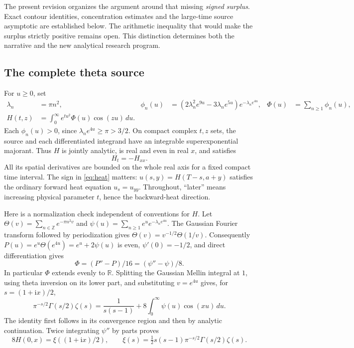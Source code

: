 \documentclass[11pt]{article}
\theoremstyle{definition}
\newcommand{\R}{\mathbb R}
\newcommand{\dd}{\,d}
\newcommand{\ii}{\mathrm i}
\begin{document}
The present revision organizes the argument around that missing
\emph{signed surplus}. Exact contour identities, concentration
estimates and the large-time source asymptotic are established below.
The arithmetic inequality that would make the surplus strictly positive
remains open. This distinction determines both the narrative and the
new analytical research program.

\subsection{The complete theta source}
For \(u\ge0\), set
\begin{align}
 \lambda_n&=\pi n^2,&
 \phi_n(u)&=(2\lambda_n^2e^{9u}-3\lambda_ne^{5u})
                      e^{-\lambda_ne^{4u}},&
 \Phi(u)&=\sum_{n\ge1}\phi_n(u), \label{eq:source}\\
 H(t,z)&=\int_0^\infty e^{tu^2}\Phi(u)\cos(zu)\dd u. \label{eq:H}
\end{align}
Each \(\phi_n(u)>0\), since
\(\lambda_ne^{4u}\ge\pi>3/2\). On compact complex \(t,z\) sets, the
source and each differentiated integrand have an integrable
superexponential majorant. Thus \(H\) is jointly analytic, is real and
even in real \(x\), and satisfies
\begin{equation}
                         H_t=-H_{xx}.                 \label{eq:heat}
\end{equation}
All its spatial derivatives are bounded on the whole real axis for a
fixed compact time interval. The sign in \eqref{eq:heat} matters:
\(u(s,y)=H(T-s,a+y)\) satisfies the ordinary forward heat equation
\(u_s=u_{yy}\). Throughout, ``later'' means increasing physical parameter
\(t\), hence the backward-heat direction.

Here is a normalization check independent of conventions for \(H\).
Let \(\Theta(v)=\sum_{n\in\mathbb Z}e^{-\pi n^2v}\) and
\(\psi(u)=\sum_{n\ge1}e^u e^{-\lambda_ne^{4u}}\).
The Gaussian Fourier transform followed by periodization gives
\(\Theta(v)=v^{-1/2}\Theta(1/v)\).
Consequently \(P(u)=e^u\Theta(e^{4u})=e^u+2\psi(u)\) is even,
\(\psi'(0)=-1/2\), and direct differentiation gives
\begin{equation}
             \Phi=(P''-P)/16=(\psi''-\psi)/8.          \label{eq:reflection}
\end{equation}
In particular \(\Phi\) extends evenly to \(\R\).
Splitting the Gaussian Mellin integral at \(1\), using theta inversion
on its lower part, and substituting \(v=e^{4u}\) gives, for
\(s=(1+\ii x)/2\),
\[
 \pi^{-s/2}\Gamma(s/2)\zeta(s)
  =\frac1{s(s-1)}+8\int_0^\infty\psi(u)\cos(xu)\dd u.
\]
The identity first follows in its convergence region and then by
analytic continuation. Twice integrating \(\psi''\) by parts proves
\begin{equation}
 8H(0,x)=\xi((1+\ii x)/2),\qquad
 \xi(s)=\tfrac12s(s-1)\pi^{-s/2}\Gamma(s/2)\zeta(s).   \label{eq:xi}
\end{equation}
\end{document}
